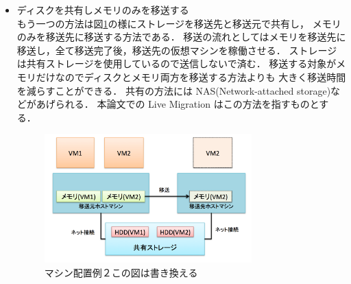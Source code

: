 \documentclass[graduation-thesis]{mlarticle}
\begin{document}
\begin{itemize}
\item ディスクを共有しメモリのみを移送する\\
      もう一つの方法は図\ref{arrangement2}の様にストレージを移送先と移送元で共有し，
メモリのみを移送先に移送する方法である．
移送の流れとしてはメモリを移送先に移送し，全て移送完了後，移送先の仮想マシンを稼働させる．
ストレージは共有ストレージを使用しているので送信しないで済む．
移送する対象がメモリだけなのでディスクとメモリ両方を移送する方法よりも
大きく移送時間を減らすことができる．
共有の方法には NAS(Network-attached storage)などがあげられる．
本論文での Live Migration はこの方法を指すものとする．
\begin{figure}[H]\begin{center}\includegraphics[width=8.0cm]{./img/arrangement2.png}\caption{ マシン配置例２この図は書き換える}\label{arrangement2}\end{center}\end{figure}
\end{itemize}
\end{document}
